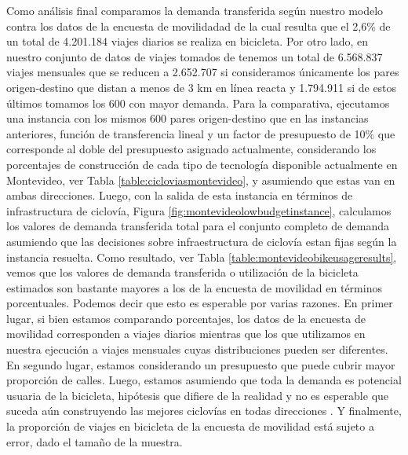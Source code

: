 Como análisis final comparamos la demanda transferida según nuestro modelo contra los datos de la encuesta de movilidadad \textcite{Mauttone2017a} de la cual resulta que el 2,6\% de un total de 4.201.184 viajes diarios se realiza en bicicleta. Por otro lado, en nuestro conjunto de datos de viajes tomados de \textcite{Massobrio2020} tenemos un total de 6.568.837 viajes mensuales que se reducen a 2.652.707 si consideramos únicamente los pares origen-destino que distan a menos de 3 km en línea reacta y 1.794.911 si de estos últimos tomamos los 600 con mayor demanda. Para la comparativa, ejecutamos una instancia con los mismos 600 pares origen-destino que en las instancias anteriores, función de transferencia lineal y un factor de presupuesto de 10\% que corresponde al doble del presupuesto asignado actualmente, considerando los porcentajes de construcción de cada tipo de tecnología disponible actualmente en Montevideo, ver Tabla \ref{table:cicloviasmontevideo}, y asumiendo que estas van en ambas direcciones. Luego, con la salida de esta instancia en términos de infrastructura de ciclovía, Figura \ref{fig:montevideolowbudgetinstance}, calculamos los valores de demanda transferida total para el conjunto completo de demanda asumiendo que las decisiones sobre infraestructura de ciclovía estan fijas según la instancia resuelta. Como resultado, ver Tabla \ref{table:montevideobikeusageresults}, vemos que los valores de demanda transferida o utilización de la bicicleta estimados son bastante mayores a los de la encuesta de movilidad en términos porcentuales. Podemos decir que esto es esperable por varias razones. En primer lugar, si bien estamos comparando porcentajes, los datos de la encuesta de movilidad corresponden a viajes diarios mientras que los que utilizamos en nuestra ejecución a viajes mensuales cuyas distribuciones pueden ser diferentes. En segundo lugar, estamos considerando un presupuesto que puede cubrir mayor proporción de calles. Luego, estamos asumiendo que toda la demanda es potencial usuaria de la bicicleta, hipótesis que difiere de la realidad y no es esperable que suceda aún construyendo las mejores ciclovías en todas direcciones \parencite{shwe2014}. Y finalmente, la proporción de viajes en bicicleta de la encuesta de movilidad está sujeto a error, dado el tamaño de la muestra.

